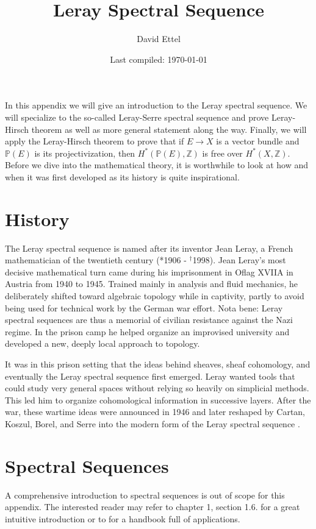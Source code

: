 \documentclass[11pt]{amsart}
\title{Leray Spectral Sequence}
\author{David Ettel}
\date{Last compiled: \today}
\begin{document}
\maketitle



In this appendix we will give an introduction to the Leray spectral sequence. We will specialize to the so-called Leray-Serre spectral sequence and prove Leray-Hirsch theorem as well as more general statement along the way. Finally, we will apply the Leray-Hirsch theorem to prove that if $E \to X$ is a vector bundle and $\mathbb{P}(E)$ is its projectivization, then $H^\ast(\mathbb{P}(E),\mathbb{Z})$ is free over $H^\ast(X,\mathbb{Z})$. Before we dive into the mathematical theory, it is worthwhile to look at how and when it was first developed as its history is quite inspirational.


\section{History}
The Leray spectral sequence is named after its inventor Jean Leray, a French mathematician of the twentieth century (*1906 - $^\dagger$1998). 
 Jean Leray's most decisive mathematical turn came during his imprisonment in Oflag XVIIA in Austria from 1940 to 1945. Trained mainly in analysis and fluid mechanics, he deliberately shifted toward algebraic topology while in captivity, partly to avoid being used for technical work by the German war effort. Nota bene: Leray spectral sequences are thus a memorial of civilian resistance against the Nazi regime. In the prison camp he helped organize an improvised university and developed a new, deeply local approach to topology. 


 It was in this prison setting that the ideas behind sheaves, sheaf cohomology, and eventually the Leray spectral sequence first emerged. Leray wanted tools that could study very general spaces without relying so heavily on simplicial methods. This led him to organize cohomological information in successive layers. After the war, these wartime ideas were announced in 1946 and later reshaped by Cartan, Koszul, Borel, and Serre into the modern form of the Leray spectral sequence \cite{Miller}. 


\section{Spectral Sequences}
A comprehensive introduction to spectral sequences is out of scope for this appendix. The interested reader may refer to \cite{risingsea} chapter 1, section 1.6. for a great intuitive introduction or  to \cite{mccleary} for a handbook full of applications.
\end{document}
